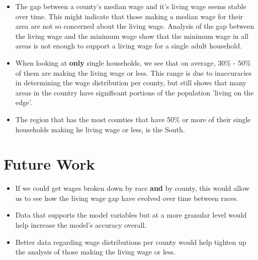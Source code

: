 \begin{itemize}
\item The gap between a county's median wage and it's living wage seems stable over time. This might indicate that those making a median wage for their area are not so concerned about the living wage. Analysis of the gap between the living wage and the minimum wage show that the minimum wage in all areas is not enough to support a living wage for a single adult household.

\item When looking at \textbf{only} single households, we see that on average, 30\% - 50\% of them are making the living wage or less. This range is due to inaccuracies in determining the wage distribution per county, but still shows that many areas in the country have significant portions of the population 'living on the edge'.

\item The region that has the most counties that have 50\% or more of their single households making he living wage or less, is the South.

\end{itemize}



\section{Future Work}

\begin{itemize}
\item If we could get wages broken down by race \textbf{and} by county, this would allow us to see how the living wage gap have evolved over time between races. 

\item Data that supports the model variables but at a more granular level would help increase the model's accuracy overall.

\item Better data regarding wage distributions per county would help tighten up the analysis of those making the living wage or less.

\end{itemize}